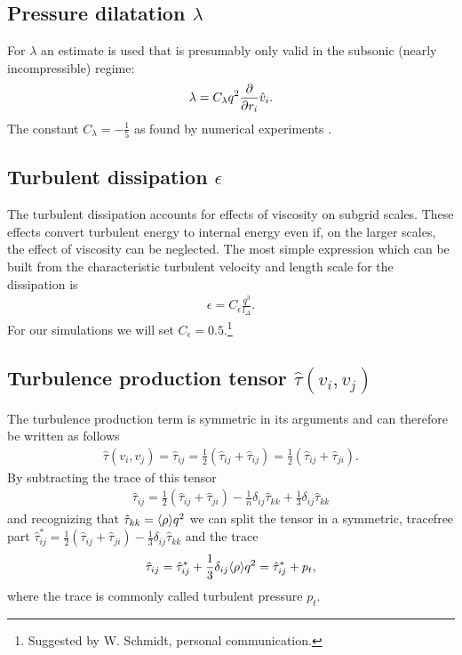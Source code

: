 \subsection{Pressure dilatation \texorpdfstring{$\lambda$}{lambda}}
For $\lambda$ an estimate is used that is presumably only valid in the
subsonic (nearly incompressible) regime:
\begin{align}
\lambda=C_{\lambda} q^2 \frac{\partial}{\partial r_i}\hat{v}_i.
\end{align}
The constant $C_{\lambda}=-\frac{1}{5}$ as found by numerical experiments
\citep{Schmidt2006}.

\subsection{Turbulent dissipation
\texorpdfstring{$\epsilon$}{epsilon}}
The turbulent dissipation accounts for effects of viscosity on subgrid scales.
These effects convert turbulent energy to internal energy even if, on the
larger scales, the effect of viscosity can be neglected. The most simple
expression which can be built from the characteristic turbulent velocity and
length scale for the dissipation is
\begin{align}
\epsilon=C_{\epsilon}\frac{q^3}{l_{\Delta}}. \label{eq:epsmodel}
\end{align}
For our simulations we will set $C_{\epsilon}=0.5$.\footnote{Suggested by
W. Schmidt, personal communication.}

\subsection{Turbulence production tensor
\texorpdfstring{$\hat{\tau}(v_i,v_j)$}{tau}}
The turbulence production term is symmetric in its arguments and can
therefore be written as follows
\begin{align}
\hat{\tau}(v_i,v_j)=\hat{\tau}_{ij}=\frac{1}{2}(\hat{\tau}_{ij}+\hat{\tau}_{ij}
)
=\frac{1}{2}(\hat{\tau}_{ij}+\hat{\tau}_{ji}).
\end{align}
By subtracting the trace of this tensor
\begin{align}
\hat{\tau}_{ij}=\frac{1}{2}(\hat{\tau}_{ij}+\hat{\tau}_{ji})
-\frac{1}{n}\delta_{ij}\hat{\tau}_{kk}+\frac{1}{3}\delta_{ij}\hat{\tau}_{kk}
\end{align}
and recognizing that $\hat{\tau}_{kk}=\langle \rho \rangle q^2 $ we can split the tensor
in a symmetric, tracefree part 
$\hat{\tau}^*_{ij}=\frac{1}{2}(\hat{\tau}_{ij}+\hat{\tau}_{ji})
-\frac{1}{3}\delta_{ij}\hat{\tau}_{kk}$ and the trace
\begin{align}
\hat{\tau}_{ij}=\hat{\tau}^*_{ij}+\frac{1}{3}\delta_{ij}\langle \rho \rangle q^2 =
\hat{\tau}^*_{ij} + p_t,
\end{align}
where the trace is commonly called turbulent pressure $p_t$.

